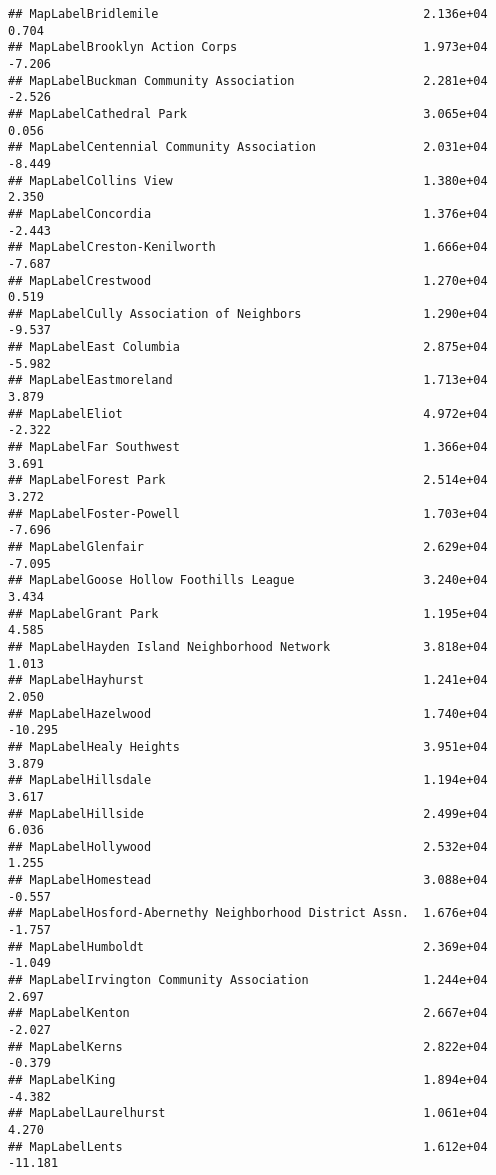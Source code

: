 \documentclass[]{article}
\begin{document}
\begin{verbatim}
## MapLabelBridlemile                                     2.136e+04   0.704
## MapLabelBrooklyn Action Corps                          1.973e+04  -7.206
## MapLabelBuckman Community Association                  2.281e+04  -2.526
## MapLabelCathedral Park                                 3.065e+04   0.056
## MapLabelCentennial Community Association               2.031e+04  -8.449
## MapLabelCollins View                                   1.380e+04   2.350
## MapLabelConcordia                                      1.376e+04  -2.443
## MapLabelCreston-Kenilworth                             1.666e+04  -7.687
## MapLabelCrestwood                                      1.270e+04   0.519
## MapLabelCully Association of Neighbors                 1.290e+04  -9.537
## MapLabelEast Columbia                                  2.875e+04  -5.982
## MapLabelEastmoreland                                   1.713e+04   3.879
## MapLabelEliot                                          4.972e+04  -2.322
## MapLabelFar Southwest                                  1.366e+04   3.691
## MapLabelForest Park                                    2.514e+04   3.272
## MapLabelFoster-Powell                                  1.703e+04  -7.696
## MapLabelGlenfair                                       2.629e+04  -7.095
## MapLabelGoose Hollow Foothills League                  3.240e+04   3.434
## MapLabelGrant Park                                     1.195e+04   4.585
## MapLabelHayden Island Neighborhood Network             3.818e+04   1.013
## MapLabelHayhurst                                       1.241e+04   2.050
## MapLabelHazelwood                                      1.740e+04 -10.295
## MapLabelHealy Heights                                  3.951e+04   3.879
## MapLabelHillsdale                                      1.194e+04   3.617
## MapLabelHillside                                       2.499e+04   6.036
## MapLabelHollywood                                      2.532e+04   1.255
## MapLabelHomestead                                      3.088e+04  -0.557
## MapLabelHosford-Abernethy Neighborhood District Assn.  1.676e+04  -1.757
## MapLabelHumboldt                                       2.369e+04  -1.049
## MapLabelIrvington Community Association                1.244e+04   2.697
## MapLabelKenton                                         2.667e+04  -2.027
## MapLabelKerns                                          2.822e+04  -0.379
## MapLabelKing                                           1.894e+04  -4.382
## MapLabelLaurelhurst                                    1.061e+04   4.270
## MapLabelLents                                          1.612e+04 -11.181

\end{verbatim}
\end{document}
